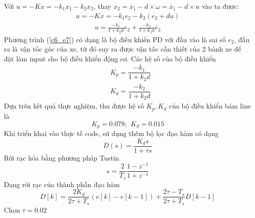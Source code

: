           \hspace*{0.6cm}Với $u = -Kx = -k_1x_1 - k_2x_2$, thay $x_2 = \dot{x_1} - d \times \omega = \dot{x_1} - d \times u$ vào ta được:
          \begin{align*}
               u = -Kx = -k_1e_2 - k_2(\dot{e_2} + du)
          \end{align*}
          \begin{align}
               u = \frac{-k_1}{1 + k_2d}e_2 + \frac{-k_2}{1 + k_2d}\dot{e_2}
               \label{c6_e7}
          \end{align}
          \hspace*{0.6cm}Phương trình (\ref{c6_e7}) có dạng là bộ điều khiển PD với đầu vào là sai số $e_2$, đầu ra là vận tốc góc của xe, từ đó suy ra được vận tốc cần thiết của 2 bánh xe để đặt làm input cho bộ điều khiển động cơ. Các hệ số của bộ điều khiển
          \begin{align*}  
               &K_p = \dfrac{-k_1}{1+k_2 d}\\
               &K_d = \dfrac{-k_2}{1 + k_2 d}
          \end{align*}
          \hspace*{0.6cm}Dựa trên kết quả thực nghiệm, thu được hệ số $K_p, K_d$ của bộ điều khiển bám line là
          \begin{equation*}
               K_p = 0.078; \,\ K_d = 0.015
          \end{equation*}
          \hspace{0.6cm}Khi triển khai vào thực tế code, sử dụng thêm bộ lọc đạo hàm có dạng
          \begin{equation*}
               D(s) = \dfrac{K_d s}{1 + \tau s}
          \end{equation*}
          \hspace{0.6cm}Rời rạc hóa bằng phương pháp Tustin
          \begin{equation*}
               s = \dfrac{2}{T_s} \dfrac{1 - z^{-1}}{1 + z^{-1}}
          \end{equation*} 
          \hspace{0.6cm}Dạng rời rạc của thành phần đạo hàm
          \begin{equation*}
               D[k] = \dfrac{2 K_d}{2 \tau + T_s} (e[k] - e[k - 1]) + \dfrac{2 \tau - T_s}{2 \tau + T_s} D[k - 1]
          \end{equation*}
          \hspace{0.6cm}Chọn $\tau = 0.02$ 
